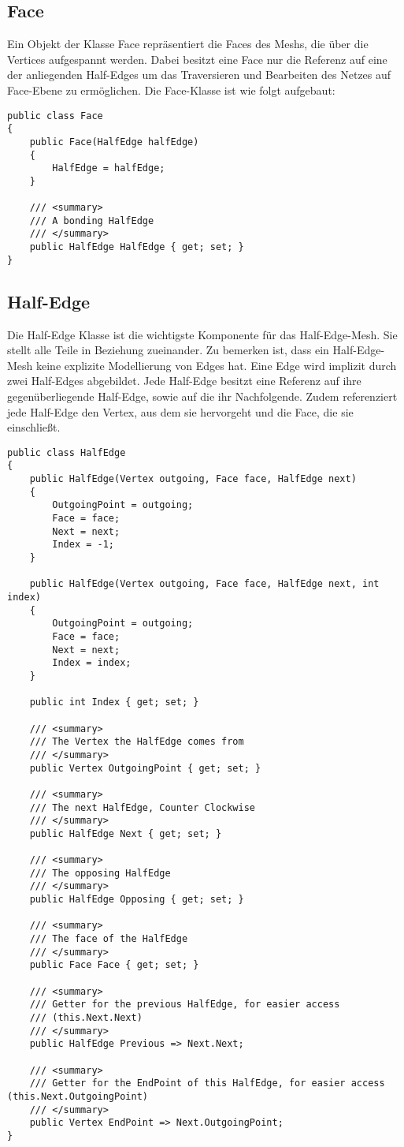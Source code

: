 \subsection{Face}
Ein Objekt der Klasse Face repr\"asentiert die Faces des Meshs, die \"uber die Vertices aufgespannt werden. Dabei besitzt eine Face nur die Referenz auf eine der anliegenden Half-Edges um das Traversieren und Bearbeiten des Netzes auf Face-Ebene zu erm\"oglichen. Die Face-Klasse ist wie folgt aufgebaut:
\begin{lstlisting}
public class Face
{
	public Face(HalfEdge halfEdge)
	{
		HalfEdge = halfEdge;
	}

	/// <summary>
	/// A bonding HalfEdge
	/// </summary>
	public HalfEdge HalfEdge { get; set; }
}
\end{lstlisting}

\subsection{Half-Edge}
Die Half-Edge Klasse ist die wichtigste Komponente f\"ur das Half-Edge-Mesh. Sie stellt alle Teile in Beziehung zueinander. Zu bemerken ist, dass ein Half-Edge-Mesh keine explizite Modellierung von Edges hat. Eine Edge wird implizit durch zwei Half-Edges abgebildet. Jede Half-Edge besitzt eine Referenz auf ihre gegen\"uberliegende Half-Edge, sowie auf die ihr Nachfolgende. Zudem referenziert jede Half-Edge den Vertex, aus dem sie hervorgeht und die Face, die sie einschlie{\ss}t. 
\begin{lstlisting}
public class HalfEdge
{
	public HalfEdge(Vertex outgoing, Face face, HalfEdge next)
	{
		OutgoingPoint = outgoing;
		Face = face;
		Next = next;
		Index = -1;
	}
	
	public HalfEdge(Vertex outgoing, Face face, HalfEdge next, int index)
	{
		OutgoingPoint = outgoing;
		Face = face;
		Next = next;
		Index = index;
	}
	
	public int Index { get; set; }
	
	/// <summary>
	/// The Vertex the HalfEdge comes from
	/// </summary>
	public Vertex OutgoingPoint { get; set; }
	
	/// <summary>
	/// The next HalfEdge, Counter Clockwise
	/// </summary>
	public HalfEdge Next { get; set; }
	
	/// <summary>
	/// The opposing HalfEdge
	/// </summary>
	public HalfEdge Opposing { get; set; }
	
	/// <summary>
	/// The face of the HalfEdge
	/// </summary>
	public Face Face { get; set; }
	
	/// <summary>
	/// Getter for the previous HalfEdge, for easier access 
	/// (this.Next.Next)
	/// </summary>
	public HalfEdge Previous => Next.Next;
	
	/// <summary>
	/// Getter for the EndPoint of this HalfEdge, for easier access (this.Next.OutgoingPoint)
	/// </summary>
	public Vertex EndPoint => Next.OutgoingPoint;
}
\end{lstlisting} 
